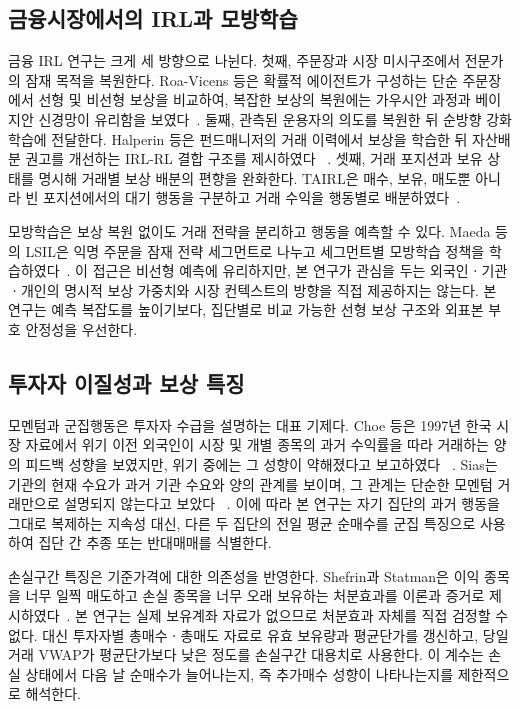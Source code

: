 \documentclass[sigconf,nonacm]{acmart}
\begin{document}
\subsection{금융시장에서의 IRL과 모방학습}

금융 IRL 연구는 크게 세 방향으로 나뉜다. 첫째, 주문장과 시장 미시구조에서
전문가의 잠재 목적을 복원한다. Roa-Vicens 등은 확률적 에이전트가 구성하는 단순
주문장에서 선형 및 비선형 보상을 비교하여, 복잡한 보상의 복원에는 가우시안 과정과
베이지안 신경망이 유리함을 보였다~\cite{roavicens2019lob}. 둘째, 관측된 운용자의
의도를 복원한 뒤 순방향 강화학습에 전달한다. Halperin 등은 펀드매니저의 거래
이력에서 보상을 학습한 뒤 자산배분 권고를 개선하는 IRL-RL 결합 구조를 제시하였다
~\cite{halperin2022combining}. 셋째, 거래 포지션과 보유 상태를 명시해 거래별 보상
배분의 편향을 완화한다. TAIRL은 매수, 보유, 매도뿐 아니라 빈 포지션에서의 대기
행동을 구분하고 거래 수익을 행동별로 배분하였다~\cite{sun2023transaction}.

모방학습은 보상 복원 없이도 거래 전략을 분리하고 행동을 예측할 수 있다. Maeda
등의 LSIL은 익명 주문을 잠재 전략 세그먼트로 나누고 세그먼트별 모방학습 정책을
학습하였다~\cite{maeda2020latent}. 이 접근은 비선형 예측에 유리하지만, 본 연구가
관심을 두는 외국인ㆍ기관ㆍ개인의 명시적 보상 가중치와 시장 컨텍스트의 방향을 직접
제공하지는 않는다. 본 연구는 예측 복잡도를 높이기보다, 집단별로 비교 가능한 선형
보상 구조와 외표본 부호 안정성을 우선한다.

\subsection{투자자 이질성과 보상 특징}

모멘텀과 군집행동은 투자자 수급을 설명하는 대표 기제다. Choe 등은 1997년 한국
시장 자료에서 위기 이전 외국인이 시장 및 개별 종목의 과거 수익률을 따라 거래하는
양의 피드백 성향을 보였지만, 위기 중에는 그 성향이 약해졌다고 보고하였다
~\cite{choe1999foreign}. Sias는 기관의 현재 수요가 과거 기관 수요와 양의 관계를
보이며, 그 관계는 단순한 모멘텀 거래만으로 설명되지 않는다고 보았다
~\cite{sias2004institutional}. 이에 따라 본 연구는 자기 집단의 과거 행동을 그대로
복제하는 지속성 대신, 다른 두 집단의 전일 평균 순매수를 군집 특징으로 사용하여
집단 간 추종 또는 반대매매를 식별한다.

손실구간 특징은 기준가격에 대한 의존성을 반영한다. Shefrin과 Statman은 이익
종목을 너무 일찍 매도하고 손실 종목을 너무 오래 보유하는 처분효과를 이론과
증거로 제시하였다~\cite{shefrin1985disposition}. 본 연구는 실제 보유계좌 자료가
없으므로 처분효과 자체를 직접 검정할 수 없다. 대신 투자자별 총매수ㆍ총매도 자료로
유효 보유량과 평균단가를 갱신하고, 당일 거래 VWAP가 평균단가보다 낮은 정도를
손실구간 대용치로 사용한다. 이 계수는 손실 상태에서 다음 날 순매수가 늘어나는지,
즉 추가매수 성향이 나타나는지를 제한적으로 해석한다.
\end{document}
